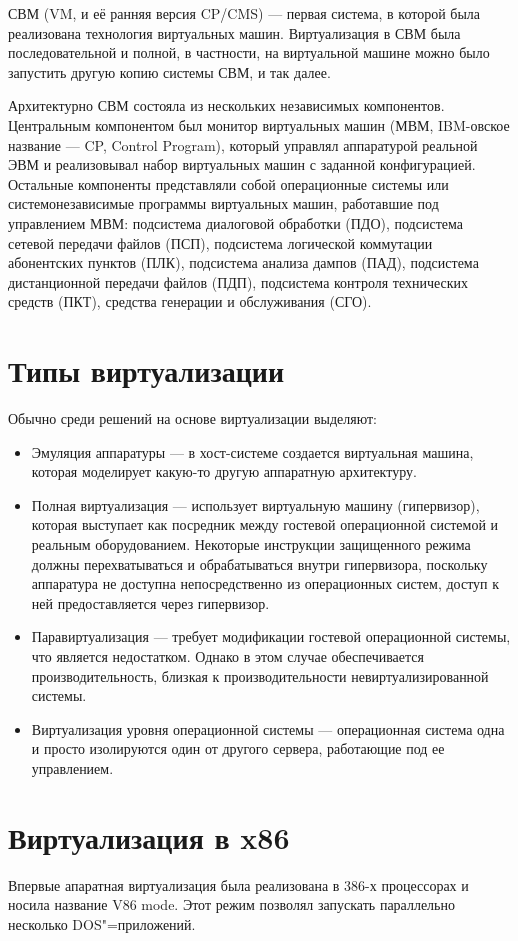 \documentclass[10pt, a5paper]{article}
\begin{document}
СВМ (VM, и её ранняя версия CP/CMS) --- первая система, в которой была реализована технология виртуальных машин. Виртуализация в СВМ была последовательной и полной, в частности, на виртуальной машине можно было запустить другую копию системы СВМ, и так далее.

Архитектурно СВМ состояла из нескольких независимых компонентов. Центральным компонентом был монитор виртуальных машин (МВМ, IBM-овское название --- CP, Control Program), который управлял аппаратурой реальной ЭВМ и реализовывал набор виртуальных машин с заданной конфигурацией. Остальные компоненты представляли собой операционные системы или системонезависимые программы виртуальных машин, работавшие под управлением МВМ: подсистема диалоговой обработки (ПДО), подсистема сетевой передачи файлов (ПСП), подсистема логической коммутации абонентских пунктов (ПЛК), подсистема анализа дампов (ПАД), подсистема дистанционной передачи файлов (ПДП), подсистема контроля технических средств (ПКТ), средства генерации и обслуживания (СГО).

\section*{Типы виртуализации}
Обычно среди решений на основе виртуализации выделяют:
\begin{itemize}
	\item Эмуляция аппаратуры --- в хост-системе создается виртуальная машина, которая моделирует какую-то другую аппаратную архитектуру.
	\item Полная виртуализация --- использует виртуальную машину (гипервизор), которая выступает как посредник между гостевой операционной системой и реальным оборудованием. Некоторые инструкции защищенного режима должны перехватываться и обрабатываться внутри гипервизора, поскольку аппаратура не доступна непосредственно из операционных систем, доступ к ней предоставляется через гипервизор.
	\item Паравиртуализация --- требует модификации гостевой операционной системы, что является недостатком. Однако в этом случае обеспечивается производительность, близкая к производительности невиртуализированной системы. 
	\item Виртуализация уровня операционной системы --- операционная система одна и просто изолируются один от другого сервера, работающие под ее управлением.
\end{itemize}

\section*{Виртуализация в x86}
Впервые апаратная виртуализация была реализована в 386-х процессорах и носила название V86 mode. Этот режим позволял запускать параллельно несколько DOS"=приложений.
\end{document}

